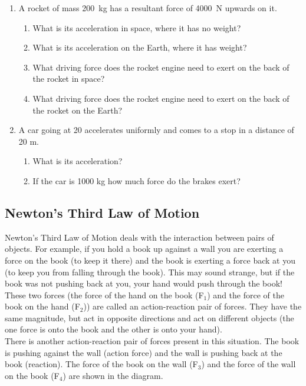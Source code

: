 \begin{enumerate}
\item{A rocket of mass 200~kg has a resultant force of 4000~N upwards on it.
\begin{enumerate}
\item{What is its acceleration in space, where it has no weight?}
\item{What is its acceleration on the Earth, where it has weight?}
\item{What driving force does the rocket engine need to exert on the back of the rocket in space?}
\item{What driving force does the rocket engine need to exert on the back of the rocket on the Earth?}
\end{enumerate}}

\item{A car going at 20 \ms accelerates uniformly and comes to a stop in a distance of 20 m.
\begin{enumerate}
\item What is its acceleration?
\item If the car is 1000 kg how much force do the brakes exert?
\end{enumerate}}



\end{enumerate}





\subsection{Newton's Third Law of Motion}
Newton's Third Law of Motion deals with the interaction between pairs of objects. For example, if you hold a book up against a wall you are exerting a force on the book (to keep it there) and the book is exerting a force back at you (to keep you from falling through the book). This may sound strange, but if the book was not pushing back at you, your hand would push through the book! These two forces (the force of the hand on the book (F$_{1}$) and the force of the book on the hand (F$_{2}$)) are called an action-reaction pair of forces. They have the same magnitude, but act in opposite directions and act on different objects (the one force is onto the book and the other is onto your hand). \\

There is another action-reaction pair of forces present in this situation. The book is pushing against the wall (action force) and the wall is pushing back at the book (reaction). The force of the book on the wall (F$_{3}$) and the force of the wall on the book (F$_{4}$) are shown in the diagram.

